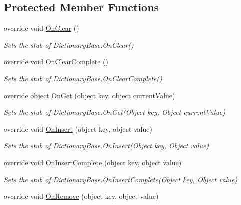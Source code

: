 \subsection*{Protected Member Functions}
\begin{DoxyCompactItemize}
\item 
override void \hyperlink{class_system_1_1_collections_1_1_fakes_1_1_stub_dictionary_base_ab52c7d1a94c043d6dc1bb88d1aa54da0}{On\-Clear} ()
\begin{DoxyCompactList}\small\item\em Sets the stub of Dictionary\-Base.\-On\-Clear()\end{DoxyCompactList}\item 
override void \hyperlink{class_system_1_1_collections_1_1_fakes_1_1_stub_dictionary_base_aa9c3ada36f375b2907817764cd035e41}{On\-Clear\-Complete} ()
\begin{DoxyCompactList}\small\item\em Sets the stub of Dictionary\-Base.\-On\-Clear\-Complete()\end{DoxyCompactList}\item 
override object \hyperlink{class_system_1_1_collections_1_1_fakes_1_1_stub_dictionary_base_a782a284c795028ab8c8f2a094672a95e}{On\-Get} (object key, object current\-Value)
\begin{DoxyCompactList}\small\item\em Sets the stub of Dictionary\-Base.\-On\-Get(\-Object key, Object current\-Value)\end{DoxyCompactList}\item 
override void \hyperlink{class_system_1_1_collections_1_1_fakes_1_1_stub_dictionary_base_afba12893b0de52815bda7c7b0d71b8b4}{On\-Insert} (object key, object value)
\begin{DoxyCompactList}\small\item\em Sets the stub of Dictionary\-Base.\-On\-Insert(\-Object key, Object value)\end{DoxyCompactList}\item 
override void \hyperlink{class_system_1_1_collections_1_1_fakes_1_1_stub_dictionary_base_ae0a0e6d8ff5634bc292a88487cd023a4}{On\-Insert\-Complete} (object key, object value)
\begin{DoxyCompactList}\small\item\em Sets the stub of Dictionary\-Base.\-On\-Insert\-Complete(\-Object key, Object value)\end{DoxyCompactList}\item 
override void \hyperlink{class_system_1_1_collections_1_1_fakes_1_1_stub_dictionary_base_a5ba70b9a777d315b3220ee25a75832eb}{On\-Remove} (object key, object value)

\end{DoxyCompactItemize}
